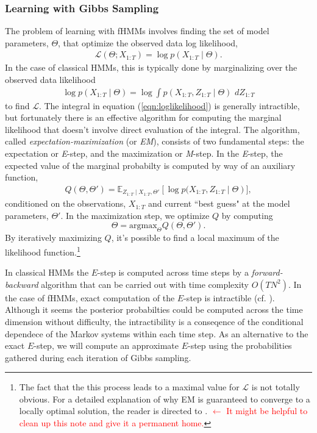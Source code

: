 \documentclass{amsart}
\begin{document}
\subsubsection{Learning with Gibbs Sampling}
The problem of learning with fHMMs involves finding the set of model parameters, $\Theta$, that optimize the observed data log likelihood, 
\begin{eqnarray*}
\mathcal L(\Theta;X_{1:T}) = \log p(X_{1:T}\mid \Theta).
\end{eqnarray*}
In the case of classical HMMs, this is typically done by marginalizing over the observed data likelihood
\begin{eqnarray}\label{eqn:loglikelihood}
\log p(X_{1:T}\mid \Theta) = \log\int p(X_{1:T},Z_{1:T}\mid \Theta)\,\,dZ_{1:T}
\end{eqnarray}
to find $\mathcal L$.  The integral in equation (\ref{eqn:loglikelihood}) is generally intractible, 
but fortunately there is an effective algorithm for computing the marginal likelihood that 
doesn't involve direct evaluation of the integral.  The algorithm, called 
{\em expectation-maximization} (or {\em EM}), consists of two 
fundamental steps: the expectation or {\em E}-step, and the maximization or 
{\em M}-step.  In the {\em E}-step, the expected value of the marginal probabilty is computed 
by way of an auxiliary function,
\begin{eqnarray}
Q(\Theta,\Theta') = \mathbb E_{Z_{1:T}\mid X_{1:T},\Theta'}\left[\log p(X_{1:T},Z_{1:T}\mid \Theta\right)],
\end{eqnarray}
conditioned on the observations, $X_{1:T}$ and current ``best guess" at the model parameters, $\Theta'$.  In the maximization step, we optimize $Q$ by computing 
\[
\Theta = \text{argmax}_{\Theta}Q(\Theta,\Theta').
\]
By iteratively maximizing $Q$, it's possible to find a local maximum of the likelihood function.\footnote{The fact that the this process leads to a maximal value for $\mathcal L$ is not totally obvious.  For a detailed explanation of why EM is guaranteed to converge to a locally optimal solution, the reader is directed to \cite[$\S2.2$]{HVB20}. \textcolor{red}{$\leftarrow$ It might be helpful to clean up this note and give it a permanent home.}}

In classical HMMs the $E$-step is computed across time steps by a {\em forward-backward} 
algorithm that can be carried out with time complexity $O(TN^2)$.  In the case of 
fHMMs, exact computation of the $E$-step is intractible (cf. \cite[$\S3.3$]{GJ95}).  
Although it seems the posterior probabilties could be computed across the time 
dimension without difficulty, the intractibility is a conseqence of the conditional 
dependece of the Markov systems within each time step.  As an alternative to the 
exact $E$-step, we will compute an approximate $E$-step using the probabilities 
gathered during each iteration of Gibbs sampling.  
\end{document}
